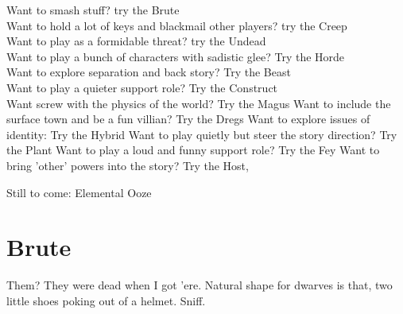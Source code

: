 \documentclass{tufte-book}
\begin{document}
Want to smash stuff? try the Brute\\
Want to hold a lot of keys and blackmail other players? try the Creep\\
Want to play as a formidable threat? try the Undead\\
Want to play a bunch of characters with sadistic glee? Try the Horde\\
Want to explore separation and back story? Try the Beast\\
Want to play a quieter support role? Try the Construct\\
Want screw with the physics of the world? Try the Magus
Want to include the surface town and be a fun villian? Try the Dregs
Want to explore issues of identity: Try the Hybrid
Want to play quietly but steer the story direction? Try the Plant
Want to play a loud and funny support role? Try the Fey
Want to bring 'other' powers into the story? Try the  Host, 


Still to come:
Elemental Ooze 


\chapter{Brute}

Them? They were dead when I got 'ere. Natural shape for dwarves is that, two little shoes poking out of a helmet. Sniff.


\end{document}
